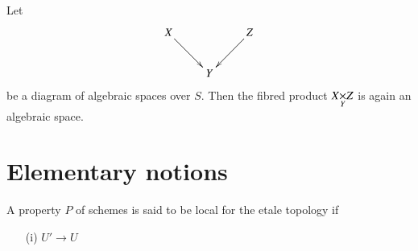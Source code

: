 \begin{proposition}\label{art02-prop1.8}
Let
\[
\xymatrix{
X\ar[dr] & & Z\ar[dl]\\
 & Y &
}
\]
be a diagram of algebraic spaces over $S$. Then the fibred product $\fprod{X}{Z}{Y}$ is again an algebraic space.
\end{proposition}

\section{Elementary notions}\label{art02-sec2}

\begin{definition}\label{art02-defi2.1}
A property $P$ of schemes is said to be local for the etale topology if
\begin{itemize}
\item[\rm(i)] $U'\to U$\pageoriginale 
\end{itemize}
\end{definition}




